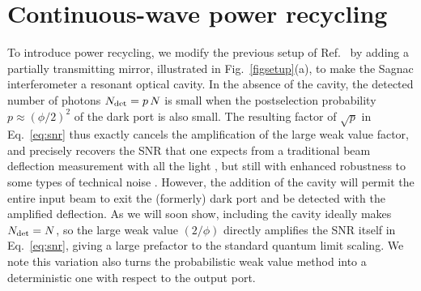 \section{Continuous-wave power recycling}
To introduce power recycling, we modify the previous setup of Ref.~\cite{Dixon2009} by adding a partially transmitting mirror, illustrated in Fig.~\ref{figsetup}(a), to make the Sagnac interferometer a resonant optical cavity.  In the absence of the cavity, the detected number of photons $N_{\rm det} = p\,N$ is small when the postselection probability $p \approx (\phi/2)^2$ of the dark port is also small.  The resulting factor of $\sqrt{p}$ in Eq.~\eqref{eq:snr} thus exactly cancels the amplification of the large weak value factor, and precisely recovers the SNR that one expects from a traditional beam deflection measurement with all the light \cite{Starling2009}, but still with enhanced robustness to some types of technical noise \cite{Jordan2014,Viza2014}.  However, the addition of the cavity will permit the entire input beam to exit the (formerly) dark port and be detected with the amplified deflection.  As we will soon show, including the cavity ideally makes $N_{\rm det} = N$, so the large weak value $(2/\phi)$ directly amplifies the SNR itself in Eq.~\eqref{eq:snr}, giving a large prefactor to the standard quantum limit scaling.  We note this variation also turns the probabilistic weak value method into a deterministic one with respect to the output port.

